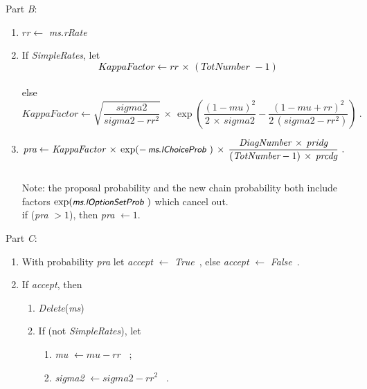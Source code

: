\documentclass[a4paper,12pt,fleqn]{article}
\newcommand{\ttimes}{\,\times\,}
\newcommand{\nnm}[1]{\textsf{\small\textit{#1}\ }}
\newcommand{\ms}{\textsl{\textsf{\small ms}}} %
\newcommand{\addcd}[1]{{\textcolor[named]{Black}{#1}}}
\begin{document}
Part \emph{B}:
\begin{enumerate}[resume]
\item $rr \leftarrow $ \ms.\nnm{rRate}
\item If \textit{SimpleRates}, let
      \addcd{
      \begin{equation}
      \textit{KappaFactor} \leftarrow  rr \,\times\, (\textit{TotNumber } - 1)
      \end{equation}
      }\\
      else
      \begin{equation}
      \textit{KappaFactor} \leftarrow \sqrt{ \frac{\textit{sigma2}}{\textit{sigma2} - rr^2} }
                  \ttimes \exp\left( \frac{\left(1 - \textit{mu} \right)^2}{2\ttimes\textit{sigma2}}
                   - \frac{\left(1 - \textit{mu}  + rr \right)^2}{2\,(\textit{sigma2} - rr^2)}  \right) \ .
      \end{equation}
\item
     \begin{align}
     \textit{pra}  \leftarrow \  & \textit{KappaFactor} \ttimes
                    \exp(-\, \ms.\nnm{lChoiceProb} )
                    \ttimes
              \frac{\textit{DiagNumber}\ttimes \textit{pridg}}
                                    {(\textit{TotNumber}-1)\ttimes\textit{prcdg}} \ .
    \end{align}
\\
    Note: the proposal probability and the new chain probability both include
    factors $\exp(\ms.\nnm{lOptionSetProb})$ which cancel out.\\
    if (\textit{pra} $ > 1$), then  \textit{pra} $ \leftarrow 1 $.
\end{enumerate}
Part \emph{C}:
\begin{enumerate}[resume]
\item With probability \textit{pra} let \textit{accept} $\leftarrow$ \nnm{True}, else
      \textit{accept} $\leftarrow$ \nnm{False}.
\item If \textit{accept}, then
      \begin{enumerate}
      \item  \textit{Delete}(\ms)
      \item  If (not \textit{SimpleRates}), let
           \begin{enumerate}
           \item \textit{mu} $\leftarrow \textit{mu} - rr$ \ ;
           \item \textit{sigma2} $\leftarrow \textit{sigma2} - rr^2 $ \ .
           \end{enumerate}
      \end{enumerate}
\end{enumerate}
\end{document}
